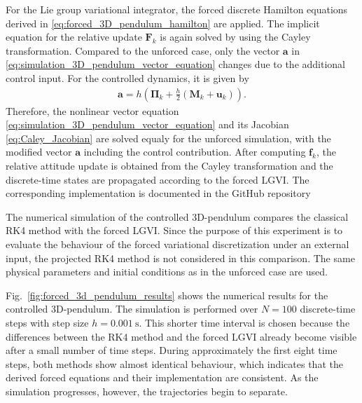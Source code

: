 For the Lie group variational integrator, the forced discrete Hamilton equations
derived in \eqref{eq:forced_3D_pendulum_hamilton} are applied. The implicit
equation for the relative update $\bm{F}_k$ is again solved by using the Cayley
transformation. Compared to the unforced case, only the vector
$\bm{a}$ in \eqref{eq:simulation_3D_pendulum_vector_equation} changes due to
the additional control input. For the controlled dynamics, it is given by
\begin{align}
    \label{eq:controlled_3d_pendulum_cayley_a}
    \bm{a}
    =
    h
    \left(
        \bm{\Pi}_k
        +
        \frac{h}{2}
        \left(
            \bm{M}_k+\bm{u}_k
        \right)
    \right).
\end{align}
Therefore, the nonlinear vector equation \eqref{eq:simulation_3D_pendulum_vector_equation}
and its Jacobian \eqref{eq:Caley_Jacobian} are solved equaly for the unforced simulation, with
the modified vector $\bm{a}$ including the control contribution. After computing
$\bm{f}_k$, the relative attitude update is obtained from the Cayley transformation
and the discrete-time states are propagated according to the forced LGVI. The corresponding implementation
is documented in the GitHub repository \cite{Elshani2026CTO_GitHub}

The numerical simulation of the controlled 3D-pendulum compares the classical RK4 method with the forced
LGVI. Since the purpose of this experiment is to evaluate the behaviour of the
forced variational discretization under an external input, the projected RK4 method
is not considered in this comparison. The same physical parameters and initial
conditions as in the unforced case are used.

Fig.~\ref{fig:forced_3d_pendulum_results} shows the numerical results for the
controlled 3D-pendulum. The simulation is performed over $N=100$ discrete-time
steps with step size $h=\SI{0.001}{\second}$. This shorter time interval is chosen
because the differences between the RK4 method and the forced LGVI already become
visible after a small number of time steps. During approximately the first eight
time steps, both methods show almost identical behaviour, which indicates that the
derived forced equations and their implementation are consistent. As the simulation
progresses, however, the trajectories begin to separate.

